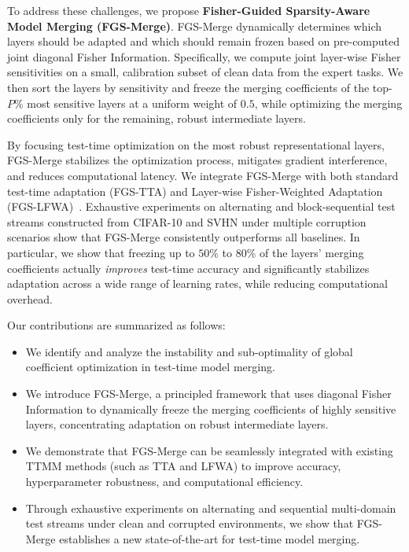 \documentclass{article}
\theoremstyle{plain}
\theoremstyle{definition}
\theoremstyle{remark}
\begin{document}
To address these challenges, we propose \textbf{Fisher-Guided Sparsity-Aware Model Merging (FGS-Merge)}. FGS-Merge dynamically determines which layers should be adapted and which should remain frozen based on pre-computed joint diagonal Fisher Information. Specifically, we compute joint layer-wise Fisher sensitivities on a small, calibration subset of clean data from the expert tasks. We then sort the layers by sensitivity and freeze the merging coefficients of the top-$P\%$ most sensitive layers at a uniform weight of $0.5$, while optimizing the merging coefficients only for the remaining, robust intermediate layers.

By focusing test-time optimization on the most robust representational layers, FGS-Merge stabilizes the optimization process, mitigates gradient interference, and reduces computational latency. We integrate FGS-Merge with both standard test-time adaptation (FGS-TTA) and Layer-wise Fisher-Weighted Adaptation (FGS-LFWA)~\cite{lfwa_anon2026}. Exhaustive experiments on alternating and block-sequential test streams constructed from CIFAR-10 and SVHN under multiple corruption scenarios show that FGS-Merge consistently outperforms all baselines. In particular, we show that freezing up to $50\%$ to $80\%$ of the layers' merging coefficients actually \textit{improves} test-time accuracy and significantly stabilizes adaptation across a wide range of learning rates, while reducing computational overhead.

Our contributions are summarized as follows:
\begin{itemize}
    \item We identify and analyze the instability and sub-optimality of global coefficient optimization in test-time model merging.
    \item We introduce FGS-Merge, a principled framework that uses diagonal Fisher Information to dynamically freeze the merging coefficients of highly sensitive layers, concentrating adaptation on robust intermediate layers.
    \item We demonstrate that FGS-Merge can be seamlessly integrated with existing TTMM methods (such as TTA and LFWA) to improve accuracy, hyperparameter robustness, and computational efficiency.
    \item Through exhaustive experiments on alternating and sequential multi-domain test streams under clean and corrupted environments, we show that FGS-Merge establishes a new state-of-the-art for test-time model merging.
\end{itemize}
\end{document}
